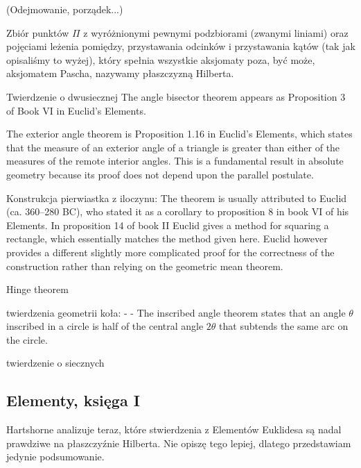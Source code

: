 (Odejmowanie, porządek...)

\begin{definition}
	Zbiór punktów $\Pi$ z wyróżnionymi pewnymi podzbiorami (zwanymi liniami) oraz pojęciami leżenia pomiędzy, przystawania odcinków i przystawania kątów (tak jak opisaliśmy to wyżej), który spełnia wszystkie aksjomaty poza, być może, aksjomatem Pascha, nazywamy płaszczyzną Hilberta.
\end{definition}


Twierdzenie o dwusiecznej %
The angle bisector theorem appears as Proposition 3 of Book VI in Euclid's Elements. 

The exterior angle theorem is Proposition 1.16 in Euclid's Elements, which states that the measure of an exterior angle of a triangle is greater than either of the measures of the remote interior angles. This is a fundamental result in absolute geometry because its proof does not depend upon the parallel postulate. %

Konstrukcja pierwiastka z iloczynu:
The theorem is usually attributed to Euclid (ca. 360–280 BC), who stated it as a corollary to proposition 8 in book VI of his Elements. In proposition 14 of book II Euclid gives a method for squaring a rectangle, which essentially matches the method given here. Euclid however provides a different slightly more complicated proof for the correctness of the construction rather than relying on the geometric mean theorem.


Hinge theorem %

twierdzenia geometrii koła:
- %
- The inscribed angle theorem states that an angle $\theta$ inscribed in a circle is half of the central angle $2\theta$ that subtends the same arc on the circle. 



twierdzenie o siecznych


\subsection{Elementy, księga I}
Hartshorne analizuje teraz, które stwierdzenia z Elementów Euklidesa są nadal prawdziwe na płaszczyźnie Hilberta.
Nie opiszę tego lepiej, dlatego przedstawiam jedynie podsumowanie.

